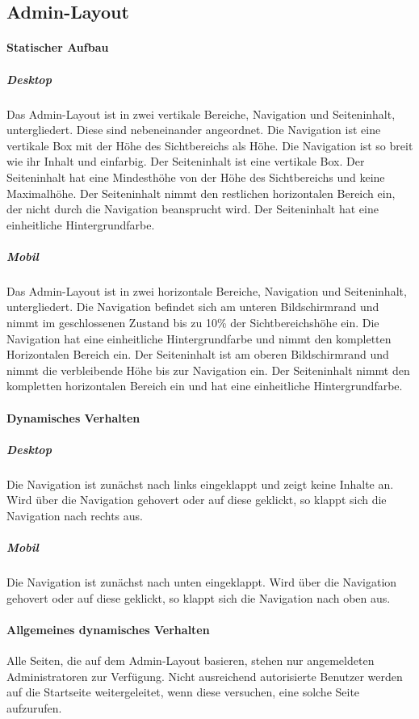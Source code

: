 \subsection{Admin-Layout}

\paragraph*{Statischer Aufbau}
\subparagraph*{Desktop}
Das Admin-Layout ist in zwei vertikale Bereiche, Navigation und Seiteninhalt, untergliedert. Diese sind nebeneinander angeordnet.
Die Navigation ist eine vertikale Box mit der Höhe des Sichtbereichs als Höhe.
Die Navigation ist so breit wie ihr Inhalt und einfarbig.
Der Seiteninhalt ist eine vertikale Box. Der Seiteninhalt hat eine Mindesthöhe von der Höhe des Sichtbereichs und keine Maximalhöhe.
Der Seiteninhalt nimmt den restlichen horizontalen Bereich ein, der nicht durch die Navigation beansprucht wird.
Der Seiteninhalt hat eine einheitliche Hintergrundfarbe.

\subparagraph*{Mobil}
Das Admin-Layout ist in zwei horizontale Bereiche, Navigation und Seiteninhalt, untergliedert.
Die Navigation befindet sich am unteren Bildschirmrand und nimmt im geschlossenen Zustand bis zu 10\% der Sichtbereichshöhe ein.
Die Navigation hat eine einheitliche Hintergrundfarbe und nimmt den kompletten Horizontalen Bereich ein.
Der Seiteninhalt ist am oberen Bildschirmrand und nimmt die verbleibende Höhe bis zur Navigation ein.
Der Seiteninhalt nimmt den kompletten horizontalen Bereich ein und hat eine einheitliche Hintergrundfarbe.

\paragraph*{Dynamisches Verhalten}
\subparagraph*{Desktop}
Die Navigation ist zunächst nach links eingeklappt und zeigt keine Inhalte an. Wird über die Navigation gehovert oder auf diese geklickt,
so klappt sich die Navigation nach rechts aus. 

\subparagraph*{Mobil}
Die Navigation ist zunächst nach unten eingeklappt. Wird über die Navigation gehovert oder auf diese geklickt,
so klappt sich die Navigation nach oben aus.

\paragraph*{Allgemeines dynamisches Verhalten}
Alle Seiten, die auf dem Admin-Layout basieren, stehen nur angemeldeten Administratoren zur Verfügung. 
Nicht ausreichend autorisierte Benutzer werden auf die Startseite weitergeleitet, wenn diese versuchen, eine solche Seite aufzurufen.

